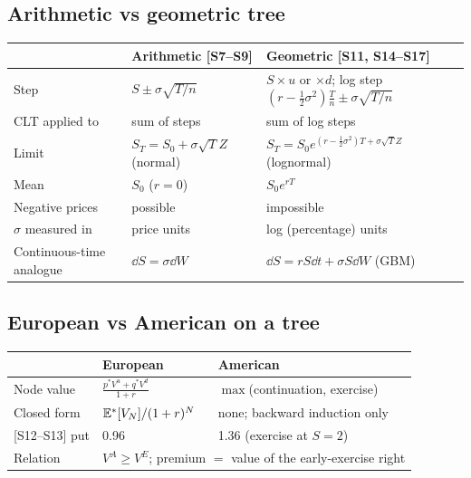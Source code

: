 \documentclass[10pt]{article}
\begin{document}
\subsection{Arithmetic vs geometric tree}
{\small\begin{tabularx}{\linewidth}{@{}l X X@{}}\toprule
 & Arithmetic [S7--S9] & Geometric [S11, S14--S17]\\\midrule
Step & $S\pm\sigma\sqrt{T/n}$ & $S\times u$ or $\times d$; log step $(r-\frac12\sigma^2)\frac Tn\pm\sigma\sqrt{T/n}$\\
CLT applied to & sum of steps & sum of log steps\\
Limit & $S_T=S_0+\sigma\sqrt TZ$ (normal) & $S_T=S_0e^{(r-\frac12\sigma^2)T+\sigma\sqrt TZ}$ (lognormal)\\
Mean & $S_0$ ($r=0$) & $S_0e^{rT}$\\
Negative prices & possible & impossible\\
$\sigma$ measured in & price units & log (percentage) units\\
Continuous-time analogue & $\dd S=\sigma\dd W$ & $\dd S=rS\dd t+\sigma S\dd W$ (GBM)\\\bottomrule
\end{tabularx}}
\subsection{European vs American on a tree}
{\small\begin{tabularx}{\linewidth}{@{}l X X@{}}\toprule
 & European & American\\\midrule
Node value & $\frac{p^*V^u+q^*V^d}{1+r}$ & $\max$(continuation, exercise)\\
Closed form & $\mathbb{E}^*[V_N]/(1+r)^N$ & none; backward induction only\\
{[S12--S13]} put & 0.96 & 1.36 (exercise at $S=2$)\\
Relation & \multicolumn{2}{l}{$V^A\ge V^E$; premium $=$ value of the early-exercise right}\\\bottomrule
\end{tabularx}}
\end{document}
